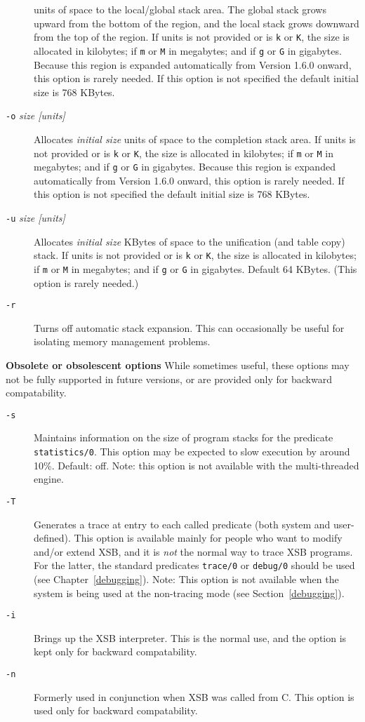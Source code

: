 \begin{description}
\begin{description}
  units of space to the local/global stack area.  The global stack
  grows upward from the bottom of the region, and the local stack
  grows downward from the top of the region.  If units is not provided
  or is {\tt k} or {\tt K}, the size is allocated in kilobytes; if
  {\tt m} or {\tt M} in megabytes; and if {\tt g} or {\tt G} in
  gigabytes.  Because this region is expanded automatically from
  Version 1.6.0 onward, this option is rarely needed.  If this option
  is not specified the default initial size is 768 KBytes.
%
\item[{\tt -o} {\em size [units]}] Allocates {\em initial size\/} units of
  space to the completion stack area.  If units is not provided or is
  {\tt k} or {\tt K}, the size is allocated in kilobytes; if {\tt m}
  or {\tt M} in megabytes; and if {\tt g} or {\tt G} in gigabytes.
  Because this region is expanded automatically from Version 1.6.0
  onward, this option is rarely needed. If this option is not
  specified the default initial size is 768 KBytes.  
\item[{\tt -u} {\em size [units]}] Allocates {\em initial size} KBytes of
  space to the unification (and table copy) stack.  If units is not
  provided or is {\tt k} or {\tt K}, the size is allocated in
  kilobytes; if {\tt m} or {\tt M} in megabytes; and if {\tt g} or
  {\tt G} in gigabytes.  Default 64 KBytes.  (This option is rarely
  needed.)
\item[{\tt -r}] Turns off automatic stack expansion.  This can
  occasionally be useful for isolating memory management problems.
\end{description}
\item {\bf Obsolete or obsolescent options} While sometimes useful, these
  options may not be fully supported in future versions, or are
  provided only for backward compatability.
\begin{description}
\item[{\tt -s}] Maintains information on the size of program stacks
  for the predicate {\tt statistics/0}.  This option may be expected
  to slow execution by around 10\%.  Default: off.  Note: this option
  is not available with the multi-threaded engine.
\item[{\tt -T}] Generates a trace at entry to each called predicate
    (both system and user-defined).  This option is available mainly
    for people who want to modify and/or extend XSB, and it is
    {\em not\/} the normal way to trace XSB programs.  For the
    latter, the standard predicates {\tt trace/0} or {\tt debug/0}
    should be used (see Chapter~\ref{debugging}).
    Note: This option is not available when the system is being used
    at the non-tracing mode (see Section~\ref{debugging}).
%
\item[{\tt -i}] Brings up the XSB interpreter.  This is the normal
  use, and the option is kept only for backward compatability.
%
\item[{\tt -n}] Formerly used in conjunction when XSB was called from
  C.  This option is used only for backward compatability.
\end{description}
\end{description}

